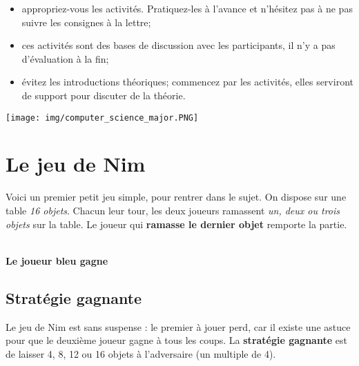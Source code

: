 \documentclass[a5paper,pagesize,DIV=14]{scrbook}
\begin{document}
\begin{itemize}
\item appropriez-vous les activités. Pratiquez-les à l'avance et n'hésitez pas à
  ne pas suivre les consignes à la lettre;
\item ces activités sont des bases de discussion avec les participants, il n'y a
  pas d'évaluation à la fin;
\item évitez les introductions théoriques; commencez par les activités, elles
  serviront de support pour discuter de la théorie.
\end{itemize}

\begin{center}
  \texttt{[image: img/computer\_science\_major.PNG]}
  \label{img:CSmajor}
\end{center}

\chapter*{Le jeu de Nim}

Voici un premier petit jeu simple, pour rentrer dans le sujet. On dispose sur
une table \textit{16 objets}. Chacun leur tour, les deux joueurs ramassent
\textit{un, deux ou trois objets} sur la table. Le joueur qui \textbf{ramasse le
  dernier objet} remporte la partie.

\bigskip
 

\bigskip
\bigskip
\bigskip

\begin{center}
 \\
\textbf{Le joueur bleu gagne}
\end{center}

\newpage

\section*{Stratégie gagnante}

Le jeu de Nim est sans suspense : le premier à jouer perd, car il existe une
astuce pour que le deuxième joueur gagne à tous les coups. La \textbf{stratégie
  gagnante} est de laisser 4, 8, 12 ou 16 objets à l'adversaire (un multiple de
4).
\end{document}
